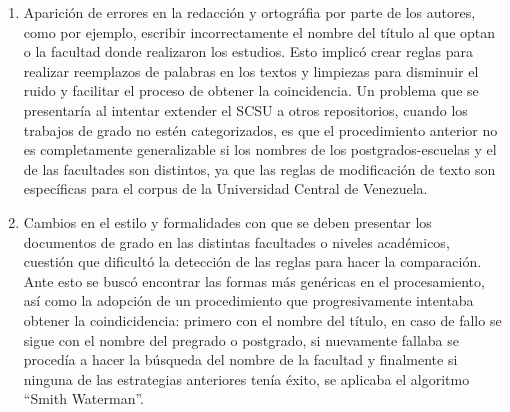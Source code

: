 \documentclass[
  12pt,
  openany]{book}
\begin{document}
\begin{enumerate}
\def\labelenumi{\arabic{enumi}.}
\item
  Aparición de errores en la redacción y ortográfia por parte de los autores, como por ejemplo, escribir incorrectamente el nombre del título al que optan o la facultad donde realizaron los estudios. Esto implicó crear reglas para realizar reemplazos de palabras en los textos y limpiezas para disminuir el ruido y facilitar el proceso de obtener la coincidencia. Un problema que se presentaría al intentar extender el SCSU a otros repositorios, cuando los trabajos de grado no estén categorizados, es que el procedimiento anterior no es completamente generalizable si los nombres de los postgrados-escuelas y el de las facultades son distintos, ya que las reglas de modificación de texto son específicas para el corpus de la Universidad Central de Venezuela.
\item
  Cambios en el estilo y formalidades con que se deben presentar los documentos de grado en las distintas facultades o niveles académicos, cuestión que dificultó la detección de las reglas para hacer la comparación. Ante esto se buscó encontrar las formas más genéricas en el procesamiento, así como la adopción de un procedimiento que progresivamente intentaba obtener la coindicidencia: primero con el nombre del título, en caso de fallo se sigue con el nombre del pregrado o postgrado, si nuevamente fallaba se procedía a hacer la búsqueda del nombre de la facultad y finalmente si ninguna de las estrategias anteriores tenía éxito, se aplicaba el algoritmo ``Smith Waterman''.


\end{enumerate}
\end{document}
